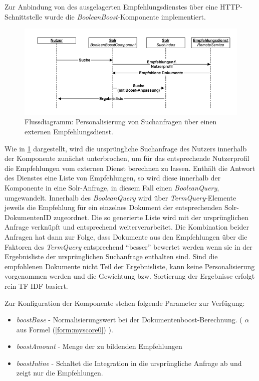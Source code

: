 Zur Anbindung von des ausgelagerten Empfehlungsdienstes über eine HTTP-Schnittstelle wurde die \textit{BooleanBoost}-Komponente implementiert.

\begin{figure}[H]
  \centering
    \includegraphics[width=\textwidth]{Abbildungen/search-rec1.png}
    \caption[Flussdiagram - externe Empfehlungen]{\footnotesize Flussdiagramm: Personalisierung von Suchanfragen über einen externen Empfehlungsdienst.}
    \label{fig:seq-extern-recommender}
\end{figure}

Wie in \ref{fig:seq-extern-recommender} dargestellt, wird die ursprüngliche Suchanfrage des Nutzers innerhalb der Komponente zunächst unterbrochen, um für das entsprechende Nutzerprofil die Empfehlungen vom externen Dienst berechnen zu lassen. Enthält die Antwort des Dienstes eine Liste von Empfehlungen, so wird diese innerhalb der Komponente in eine Solr-Anfrage, in diesem Fall einen \textit{BooleanQuery}, umgewandelt. Innerhalb des \textit{BooleanQuery} wird über \textit{TermQuery}-Elemente jeweils die Empfehlung für ein einzelnes Dokument der entsprechenden Solr-DokumentenID zugeordnet. Die so generierte Liste wird mit der ursprünglichen Anfrage verknüpft und entsprechend weiterverarbeitet. Die Kombination beider Anfragen hat dann zur Folge, dass Dokumente aus den Empfehlungen über die Faktoren des \textit{TermQuery} entsprechend ``besser'' bewertet werden wenn sie in der Ergebnisliste der ursprünglichen Suchanfrage enthalten sind. Sind die empfohlenen Dokumente nicht Teil der Ergebnisliste, kann keine Personalisierung vorgenommen werden und die Gewichtung bzw. Sortierung der Ergebnisse erfolgt rein TF-IDF-basiert.

Zur Konfiguration der Komponente stehen folgende Parameter zur Verfügung:
\begin{itemize}
\item \textit{boostBase} - Normalisierungswert bei der Dokumentenboost-Berechnung. ( $\alpha$ aus Formel (\ref{form:myscore0}) ).
\item \textit{boostAmount} - Menge der zu bildenden Empfehlungen
\item \textit{boostInline} - Schaltet die Integration in die ursprüngliche Anfrage ab und zeigt nur die Empfehlungen.
\end{itemize}

